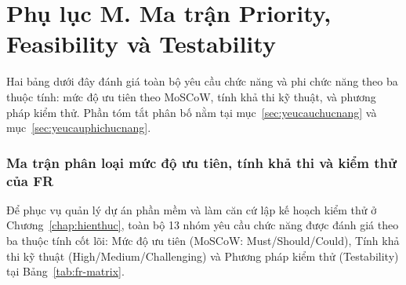 
\section*{Phụ lục M. Ma trận Priority, Feasibility và Testability}
\label{apdx:matran}

Hai bảng dưới đây đánh giá toàn bộ yêu cầu chức năng và phi chức năng theo ba
thuộc tính: mức độ ưu tiên theo MoSCoW, tính khả thi kỹ thuật, và phương pháp
kiểm thử. Phần tóm tắt phân bố nằm tại mục~\ref{sec:yeucauchucnang} và
mục~\ref{sec:yeucauphichucnang}.

\subsubsection*{Ma trận phân loại mức độ ưu tiên, tính khả thi và kiểm thử của FR}
\label{subsec:fr-matrix}

Để phục vụ quản lý dự án phần mềm và làm căn cứ lập kế hoạch kiểm thử ở Chương~\ref{chap:hienthuc}, toàn bộ 13 nhóm yêu cầu chức năng được đánh giá theo ba thuộc tính cốt lõi: Mức độ ưu tiên (MoSCoW: Must/Should/Could), Tính khả thi kỹ thuật (High/Medium/Challenging) và Phương pháp kiểm thử (Testability) tại Bảng~\ref{tab:fr-matrix}.

